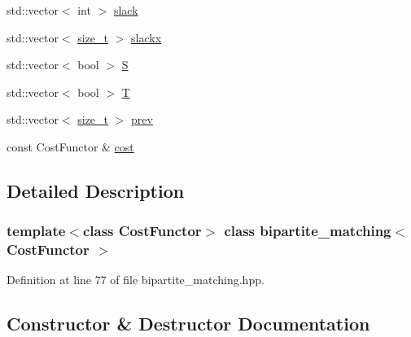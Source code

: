 \begin{DoxyCompactItemize}
\item 
std\+::vector$<$ int $>$ \hyperlink{classbipartite__matching_aff5c655d394bc2f684d0c16b79da5241}{slack}
\item 
std\+::vector$<$ \hyperlink{tutorial__fpt__2017_2intro_2sixth_2test_8c_a7c94ea6f8948649f8d181ae55911eeaf}{size\+\_\+t} $>$ \hyperlink{classbipartite__matching_aa3307590ad084a72789e531408641181}{slackx}
\item 
std\+::vector$<$ bool $>$ \hyperlink{classbipartite__matching_a7e0563ba0994677f6dd9d98442c36ef2}{S}
\item 
std\+::vector$<$ bool $>$ \hyperlink{classbipartite__matching_a448041bbbf18ef18d985929d59d34411}{T}
\item 
std\+::vector$<$ \hyperlink{tutorial__fpt__2017_2intro_2sixth_2test_8c_a7c94ea6f8948649f8d181ae55911eeaf}{size\+\_\+t} $>$ \hyperlink{classbipartite__matching_a2b0418fb8023abdc337047b4cc6b5f4e}{prev}
\item 
const Cost\+Functor \& \hyperlink{classbipartite__matching_adf0b76c9da7de5aa08ac2b135832313b}{cost}
\end{DoxyCompactItemize}


\subsection{Detailed Description}
\subsubsection*{template$<$class Cost\+Functor$>$\newline
class bipartite\+\_\+matching$<$ Cost\+Functor $>$}



Definition at line 77 of file bipartite\+\_\+matching.\+hpp.



\subsection{Constructor \& Destructor Documentation}
\mbox{\label{classbipartite__matching_a8feb206f6dea673e60db02054e3cc600}} 
